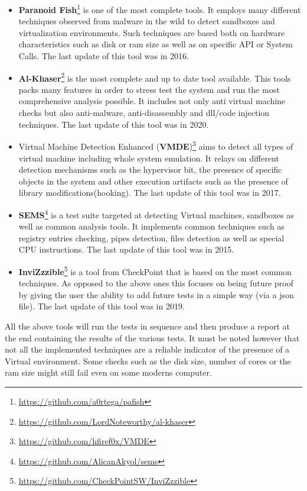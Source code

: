 \begin{itemize}
    \item \textbf{Paranoid Fish}\footnote{\url{https://github.com/a0rtega/pafish}} is one of the most complete tools. It employs many different techniques observed from malware in the wild to detect sandboxes and virtualization environments. Such techniques are based both on hardware characteristics such as disk or ram size as well as on specific API or System Calls. The last update of this tool was in 2016.
    
    \item \textbf{Al-Khaser}\footnote{\url{https://github.com/LordNoteworthy/al-khaser}} is the most complete and up to date tool available. This tools packs many features in order to stress test the system and run the most comprehensive analysis possible. It includes not only anti virtual machine checks but also anti-malware, anti-disassembly and dll/code injection techniques. The last update of this tool was in 2020.
        
    \item Virtual Machine Detection Enhanced (\textbf{VMDE})\footnote{\url{https://github.com/hfiref0x/VMDE}} aims to detect all types of virtual machine including whole system emulation. It relays on different detection mechanisms such as the hypervisor bit, the presence of specific objects in the system and other execution artifacts such as the presence of library modifications(hooking). The last update of this tool was in 2017.
    
    \item \textbf{SEMS}\footnote{\url{https://github.com/AlicanAkyol/sems}} is a test suite targeted at detecting Virtual machines, sandboxes as well as common analysis tools. It implements common techniques such as registry entries checking, pipes detection, files detection as well as special CPU instructions. The last update of this tool was in 2015.
    
    \item \textbf{InviZzzible}\footnote{\url{https://github.com/CheckPointSW/InviZzzible}} is a tool from CheckPoint that is based on the most common techniques. As opposed to the above ones this focuses on being future proof by giving the user the ability to add future tests in a simple way (via a json file). The last update of this tool was in 2019.
    
\end{itemize}

All the above tools will run the tests in sequence and then produce a report at the end containing the results of the various tests. It must be noted however that not all the implemented techniques are a reliable indicator of the presence of a Virtual environment. Some checks such as the disk size, number of cores or the ram size might still fail even on some moderns computer. 


